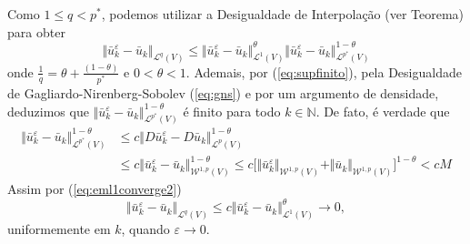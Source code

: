 \documentclass[a4paper, 11pt]{book}
\theoremstyle{definition}
\newcommand{\bN}{\mathbb{N}}
\newcommand{\cL}{\mathcal{L}}
\newcommand{\cW}{\mathcal{W}}
\begin{document}
\begin{prf}
    Como $1 \leqslant q < p^*$, podemos utilizar a Desigualdade de Interpolação (ver Teorema) para obter
    \[
        \Vert \bar u_k^\varepsilon - \bar u_k \Vert_{\cL^q(V)} \leqslant \Vert \bar u_k^\varepsilon - \bar u_k \Vert_{\cL^1(V)}^\theta \Vert \bar u_k^\varepsilon - \bar u_k \Vert_{\cL^{p^*}(V)}^{1- \theta}
    \]
    onde $\frac{1}{q} = \theta + \frac{(1 - \theta)}{p^*}$ e $0 < \theta < 1$.
    Ademais, por (\ref{eq:supfinito}), pela Desigualdade de Gagliardo-Nirenberg-Sobolev (\ref{eq:gns}) e por um argumento de densidade, deduzimos que $\Vert \bar u_k^\varepsilon - \bar u_k \Vert_{\cL^{p^*}(V)}^{1- \theta}$ é finito para todo $k \in\bN$. De fato, é verdade que
    \begin{equation} \label{eq:idk}
        \begin{aligned}
            \Vert \bar u_k^\varepsilon - \bar u_k \Vert_{\cL^{p^*}(V)}^{1 - \theta} &\leqslant c \Vert D\bar u_k^\varepsilon - D\bar u_k \Vert_{\cL^p(V)}^{1 - \theta}\\ 
            &\leqslant c \Vert \bar u_k^\varepsilon - \bar u_k \Vert_{\cW^{1,p}(V)}^{1- \theta} \leqslant c \big[\Vert \bar u_k^\varepsilon \Vert_{\cW^{1,p}(V)} + \Vert \bar u_k \Vert_{\cW^{1,p}(V)} \big]^{1-\theta} < cM 
        \end{aligned}
    \end{equation}
    Assim por (\ref{eq:eml1converge2})
    \[
        \Vert \bar u_k^\varepsilon - \bar u_k \Vert_{\cL^q(V)} \leqslant c \Vert \bar u_k^\varepsilon - \bar u_k \Vert_{\cL^1(V)}^\theta \to 0,
    \]
    uniformemente em $k$, quando $\varepsilon \to 0$.


\end{prf}
\end{document}
